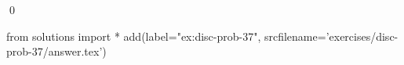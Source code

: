 
\begin{ex} 
  \label{ex:disc-prob-37}
  
  \qed
\end{ex} 
\begin{python0}
from solutions import *
add(label="ex:disc-prob-37",
    srcfilename='exercises/disc-prob-37/answer.tex') 
\end{python0}
